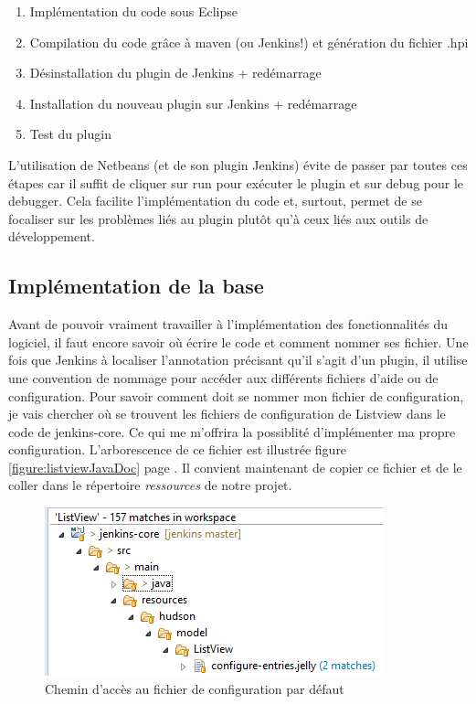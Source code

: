 \begin{enumerate}
	\item Implémentation du code sous Eclipse
	\item Compilation du code grâce à maven (ou Jenkins!) et génération du fichier .hpi
	\item Désinstallation du plugin de Jenkins + redémarrage
	\item Installation du nouveau plugin sur Jenkins + redémarrage
	\item Test du plugin
\end{enumerate}
L'utilisation de Netbeans (et de son plugin Jenkins) évite de passer par toutes ces étapes car il suffit de cliquer sur run pour exécuter le plugin et sur debug pour le debugger. Cela facilite l'implémentation du code et, surtout, permet de se focaliser sur les problèmes liés au plugin plutôt qu'à ceux liés aux outils de développement.\\


\subsection{Implémentation de la base}

Avant de pouvoir vraiment travailler à l'implémentation des fonctionnalités du logiciel, il faut encore savoir où écrire le code et comment nommer ses fichier. Une fois que Jenkins à localiser l'annotation précisant qu'il s'agit d'un plugin, il utilise une convention de nommage pour accéder aux différents fichiers d'aide ou de configuration. Pour savoir comment doit se nommer mon fichier de configuration, je vais chercher où se trouvent les fichiers de configuration de Listview dans le code de jenkins-core. Ce qui me m'offrira la possiblité d'implémenter ma propre configuration. L'arborescence de ce fichier est illustrée figure \ref{figure:listviewJavaDoc} page \pageref{figure:listviewJavaDoc}. Il convient maintenant de copier ce fichier et de le coller dans le répertoire \emph{ressources} de notre projet.


\begin{figure}[!h]
  \centering
      \includegraphics{images/listviewSearch.png}
  \caption{Chemin d'accès au fichier de configuration par défaut}
	\label{figure:listviewSearch}
\end{figure}

